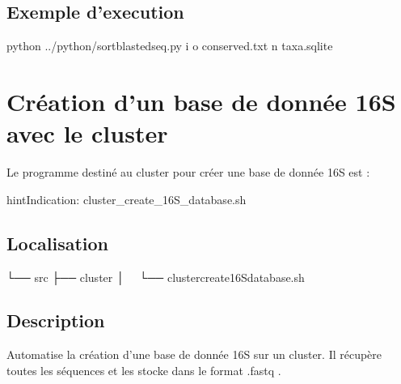\documentclass[letterpaper,10pt,french]{sphinxmanual}
\begin{document}
\subsection{Exemple d’execution}
\label{\detokenize{python/sort_blasted_seq.py:exemple-d-execution}}
\begin{sphinxVerbatim}[commandchars=\\\{\}]
python ../python/sort\PYGZus{}blasted\PYGZus{}seq.py 
\PYGZhy{}i  
\PYGZhy{}o conserved.txt 
\PYGZhy{}n taxa.sqlite
\end{sphinxVerbatim}


\section{Création d’un base de donnée 16S avec le cluster}
\label{\detokenize{cluster/cluster_create_16S_database.sh:creation-d-un-base-de-donnee-16s-avec-le-cluster}}\label{\detokenize{cluster/cluster_create_16S_database.sh::doc}}
Le programme destiné au cluster pour créer une base de donnée 16S est :

\begin{sphinxadmonition}{hint}{Indication:}
cluster\_create\_16S\_database.sh
\end{sphinxadmonition}


\subsection{Localisation}
\label{\detokenize{cluster/cluster_create_16S_database.sh:localisation}}
\begin{sphinxVerbatim}[commandchars=\\\{\}]
└── src
 ├── cluster
 │   └── cluster\PYGZus{}create\PYGZus{}16S\PYGZus{}database.sh
\end{sphinxVerbatim}


\subsection{Description}
\label{\detokenize{cluster/cluster_create_16S_database.sh:description}}
Automatise la création d’une base de donnée 16S sur un cluster. Il récupère toutes les séquences et les stocke dans le format .fastq .
\end{document}
